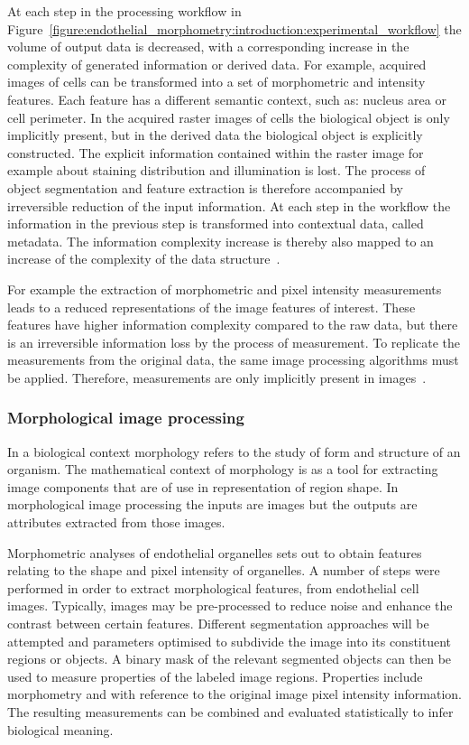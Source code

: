 At each step in the processing workflow in Figure~\ref{figure:endothelial_morphometry:introduction:experimental_workflow} the volume of output data is decreased, with a corresponding increase in the complexity of generated information or derived data. For example, acquired images of cells can be transformed into a set of morphometric and intensity features. Each feature has a different semantic context, such as: nucleus area or cell perimeter. In the acquired raster images of cells the biological object is only implicitly present, but in the derived data the biological object is explicitly constructed. The explicit information contained within the raster image for example about staining distribution and illumination is lost. The process of object segmentation and feature extraction is therefore accompanied by irreversible reduction of the input information. At each step in the workflow the information in the previous step is transformed into contextual data, called metadata. The information complexity increase is thereby also mapped to an increase of the complexity of the data structure~\cite{Prodanov2012}.

For example the extraction of morphometric and pixel intensity measurements leads to a reduced representations of the image features of interest. These features have higher information complexity compared to the raw data, but there is an irreversible information loss by the process of measurement. To replicate the measurements from the original data, the same image processing algorithms must be applied. Therefore, measurements are only implicitly present in images~\cite{Prodanov2012}.

\subsubsection{Morphological image processing}
In a biological context morphology refers to the study of form and structure of an organism. The mathematical context of morphology is as a tool for extracting image components that are of use in representation of region shape. In morphological image processing the inputs are images but the outputs are attributes extracted from those images.

Morphometric analyses of endothelial organelles sets out to obtain features relating to the shape and pixel intensity of organelles. A number of steps were performed in order to extract morphological features, from endothelial cell images. Typically, images may be pre-processed to reduce noise and enhance the contrast between certain features. Different segmentation approaches will be attempted and parameters optimised to subdivide the image into its constituent regions or objects. A binary mask of the relevant segmented objects can then be used to measure properties of the labeled image regions. Properties include morphometry and with reference to the original image pixel intensity information. The resulting measurements can be combined and evaluated statistically to infer biological meaning.

